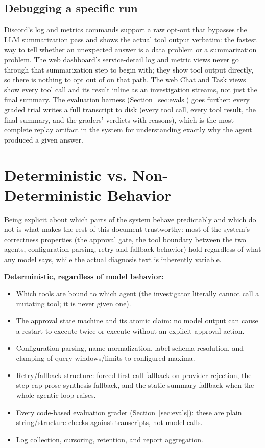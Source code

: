 \documentclass[11pt]{article}
\begin{document}
\subsection{Debugging a specific run}

Discord's log and metrics commands support a raw opt-out that bypasses the
LLM summarization pass and shows the actual tool output verbatim: the
fastest way to tell whether an unexpected answer is a data problem or a
summarization problem. The web dashboard's service-detail log and metric
views never go through that summarization step to begin with; they show
tool output directly, so there is nothing to opt out of on that path. The
web Chat and Task views
show every tool call and its result inline as an investigation streams, not
just the final summary. The evaluation harness (Section~\ref{sec:evals})
goes further: every graded trial writes a full transcript to disk (every
tool call, every tool result, the final summary, and the graders' verdicts
with reasons), which is the most complete replay artifact in the system for
understanding exactly why the agent produced a given answer.

\section{Deterministic vs. Non-Deterministic Behavior}
\label{sec:determinism}

Being explicit about which parts of the system behave predictably and which
do not is what makes the rest of this document trustworthy: most of the
system's correctness properties (the approval gate, the tool boundary
between the two agents, configuration parsing, retry and fallback behavior)
hold regardless of what any model says, while the actual diagnosis text is
inherently variable.

\textbf{Deterministic, regardless of model behavior:}
\begin{itemize}
  \item Which tools are bound to which agent (the investigator literally
    cannot call a mutating tool; it is never given one).
  \item The approval state machine and its atomic claim: no model output
    can cause a restart to execute twice or execute without an explicit
    approval action.
  \item Configuration parsing, name normalization, label-schema resolution,
    and clamping of query windows/limits to configured maxima.
  \item Retry/fallback structure: forced-first-call fallback on provider
    rejection, the step-cap prose-synthesis fallback, and the static-summary
    fallback when the whole agentic loop raises.
  \item Every code-based evaluation grader (Section~\ref{sec:evals}): these
    are plain string/structure checks against transcripts, not model calls.
  \item Log collection, cursoring, retention, and report aggregation.
\end{itemize}
\end{document}
